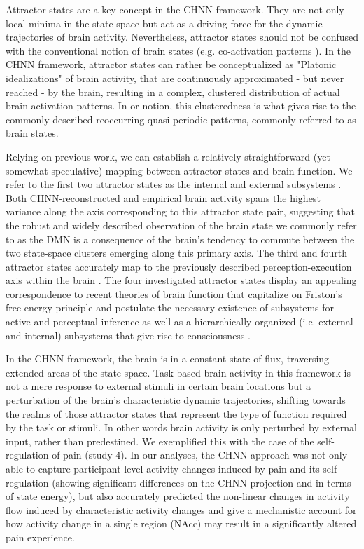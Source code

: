 \documentclass{article}
\begin{document}
Attractor states are a key concept in the CHNN framework. They are not only local minima in the state-space but act as a driving force for the dynamic trajectories of brain activity. Nevertheless, attractor states should not be confused with the conventional notion of brain states (e.g. co-activation patterns \citep{chen2015introducing}). In the CHNN framework, attractor states can rather be conceptualized as "Platonic idealizations" of brain activity, that are continuously approximated - but never reached - by the brain, resulting in a complex, clustered distribution of actual brain activation patterns. In or notion, this clusteredness is what gives rise to the commonly described reoccurring quasi-periodic patterns, commonly referred to as brain states.

Relying on previous work, we can establish a relatively straightforward (yet somewhat speculative) mapping between attractor states and brain function. We refer to the first two attractor states as the internal and external subsystems \citep{golland2008data, cioli2014differences}. Both CHNN-reconstructed and empirical brain activity spans the highest variance along the axis corresponding to this attractor state pair, suggesting that the robust and widely described observation of the brain state we commonly refer to as the DMN is a consequence of the brain's tendency to commute between the two state-space clusters emerging along this primary axis.
The third and fourth attractor states accurately map to the previously described perception-execution axis within the brain \citep{fuster2004upper}. The four investigated attractor states display an appealing correspondence to recent theories of brain function that capitalize on Friston's free energy principle \citep{friston2006free} and postulate the necessary existence of subsystems for active and perceptual inference \citep{friston2023free} as well as a hierarchically organized (i.e. external and internal) subsystems that give rise to consciousness \citep{ramstead2023inner}.

In the CHNN framework, the brain is in a constant state of flux, traversing extended areas of the state space. Task-based brain activity in this framework is not a mere response to external stimuli in certain brain locations but a perturbation of the brain's characteristic dynamic trajectories, shifting towards the realms of those attractor states that represent the type of function required by the task or stimuli. In other words brain activity is only perturbed by external input, rather than predestined. We exemplified this with the case of the self-regulation of pain (study 4).
In our analyses, the CHNN approach was not only able to capture participant-level activity changes induced by pain and its self-regulation (showing significant differences on the CHNN projection and in terms of state energy), but also accurately predicted the non-linear changes in activity flow induced by characteristic activity changes and give a mechanistic account for how activity change in a single region (NAcc) may result in a significantly altered pain experience.
\end{document}
